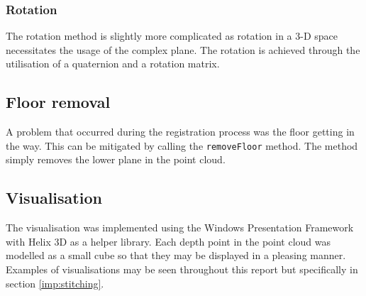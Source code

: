 \subsubsection{Rotation}
The rotation method is slightly more complicated as rotation in a 3-D space necessitates the usage of the complex plane. The rotation is achieved through the utilisation of a quaternion and a rotation matrix. \\

\subsection{Floor removal}
A problem that occurred during the registration process was the floor getting in the way. This can be mitigated by calling the \texttt{removeFloor} method. The method simply removes the lower plane in the point cloud. \\

\subsection{Visualisation}
The visualisation was implemented using the Windows Presentation Framework with Helix 3D as a helper library. Each depth point in the point cloud was modelled as a small cube so that they may be displayed in a pleasing manner. Examples of visualisations may be seen throughout this report but specifically in section \ref{imp:stitching}.
